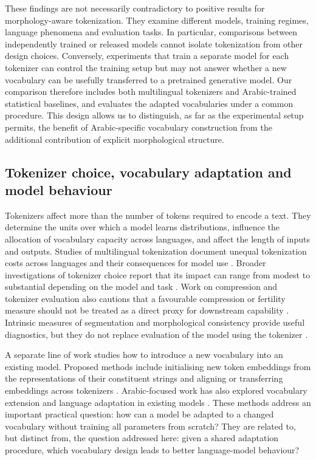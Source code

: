 \documentclass[a4paper,fleqn]{cas-sc}
\begin{document}
These findings are not necessarily contradictory to positive results for morphology-aware tokenization. They examine different models, training regimes, language phenomena and evaluation tasks. In particular, comparisons between independently trained or released models cannot isolate tokenization from other design choices. Conversely, experiments that train a separate model for each tokenizer can control the training setup but may not answer whether a new vocabulary can be usefully transferred to a pretrained generative model. Our comparison therefore includes both multilingual tokenizers and Arabic-trained statistical baselines, and evaluates the adapted vocabularies under a common procedure. This design allows us to distinguish, as far as the experimental setup permits, the benefit of Arabic-specific vocabulary construction from the additional contribution of explicit morphological structure.

\subsection{Tokenizer choice, vocabulary adaptation and model behaviour}
\label{sec:related:design}

Tokenizers affect more than the number of tokens required to encode a text. They determine the units over which a model learns distributions, influence the allocation of vocabulary capacity across languages, and affect the length of inputs and outputs. Studies of multilingual tokenization document unequal tokenization costs across languages and their consequences for model use \citep{rust2021good,petrov2023language}. Broader investigations of tokenizer choice report that its impact can range from modest to substantial depending on the model and task \citep{ali2024tokenizer,dagan2024getting,alqahtani2026stop}. Work on compression and tokenizer evaluation also cautions that a favourable compression or fertility measure should not be treated as a direct proxy for downstream capability \citep{goldman2024unpacking,schmidt2024tokenization,lotz2025beyond}. Intrinsic measures of segmentation and morphological consistency provide useful diagnostics, but they do not replace evaluation of the model using the tokenizer \citep{batsuren2024evaluating,uzan2024greed}.

A separate line of work studies how to introduce a new vocabulary into an existing model. Proposed methods include initialising new token embeddings from the representations of their constituent strings and aligning or transferring embeddings across tokenizers \citep{minixhofer2022wechsel,dobler2023focus,mundra2024empirical,li2025tokalign,goddard2025training}. Arabic-focused work has also explored vocabulary extension and language adaptation in existing models \citep{bari2025allam,zhu2025second,kashirskiy2025aratoken}. These methods address an important practical question: how can a model be adapted to a changed vocabulary without training all parameters from scratch? They are related to, but distinct from, the question addressed here: given a shared adaptation procedure, which vocabulary design leads to better language-model behaviour?
\end{document}
